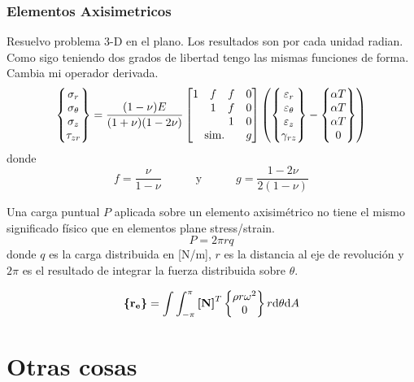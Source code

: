 \section{Elementos Axisimetricos}
Resuelvo problema 3-D en el plano. Los resultados son por cada unidad radian. Como sigo teniendo dos grados de libertad tengo las mismas funciones de forma. Cambia mi operador derivada.
\[
\begin{Bmatrix}
    \sigma_\radial \\
    \sigma_\theta \\
    \sigma_z \\
    \tau_{z\radial}
\end{Bmatrix}
= \frac{(1-\nu)E}{(1+\nu)(1-2\nu)}
\begin{bmatrix}
   1 & \eff & \eff & 0 \\
    & 1 & \eff & 0 \\
    & & 1 & 0 \\
    \textrm{sim.}\unspace& & & g 
\end{bmatrix}
\left(
\begin{Bmatrix}
\varepsilon_\radial \\
\varepsilon_\theta \\
\varepsilon_z \\
\gamma_{\radial z}
\end{Bmatrix}
-
\begin{Bmatrix}
\alpha T\\
\alpha T \\
\alpha T \\
0
\end{Bmatrix}
\right)
\]
donde 
\[
f=\frac{\nu}{1-\nu}\qquad \quad \textrm{y}\quad \qquad g=\frac{1-2\nu}{2(1-\nu)}
\]

Una carga puntual $P$ aplicada sobre un elemento axisimétrico no tiene el mismo significado físico que en elementos plane stress/strain. 
\[
P=2\pi rq
\]
donde $q$ es la carga distribuida en [N/m], $r$ es la distancia al eje de revolución y $2 \pi$ es el resultado de integrar la fuerza distribuida sobre $\theta$. 

\[
\boldsymbol{\{ }\mathbf{r_e} \boldsymbol{\}} = \int\int_{-\pi}^{\pi} \boldsymbol{[}\mathbf{N} \boldsymbol{]}^T \begin{Bmatrix}
    \rho r \omega ^2 \\
    0
\end{Bmatrix} r \textrm{d} \theta \textrm{d} A
\]
\part{Otras cosas}

